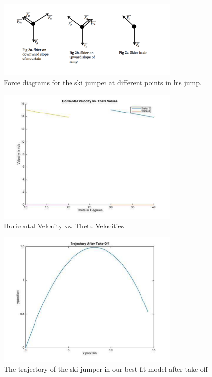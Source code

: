 \documentclass[]{IEEEphot}
\begin{document}
\begin{figure}
\centering%
\includegraphics[width=21pc]{force}
\caption{Force diagrams for the ski jumper at different points in his jump.}
\label{fig2}
\end{figure}

\begin{figure}
\centering%
\includegraphics[width=21pc]{graph1}
\caption{ Horizontal Velocity vs. Theta Velocities}
\label{fig3}
\end{figure}

\begin{figure}
\centering%
\includegraphics[width=21pc]{graph2}
\caption{ The trajectory of the ski jumper in our best fit model after take-off }
\label{fig4}
\end{figure}
\end{document}
